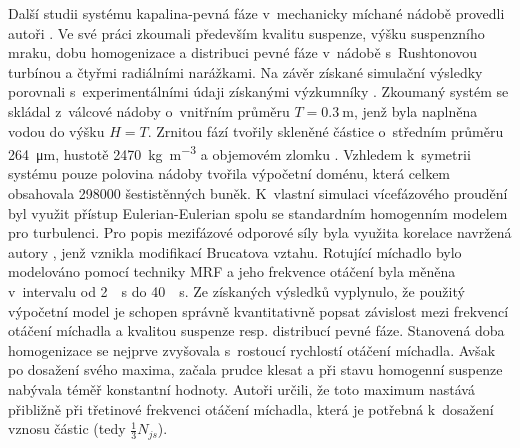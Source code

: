 Další studii systému kapalina-pevná fáze v~mechanicky míchané nádobě provedli autoři \citet{kas08}. Ve své práci zkoumali především kvalitu suspenze, výšku suspenzního mraku, dobu homogenizace a distribuci pevné fáze v~nádobě s~Rushtonovou turbínou a čtyřmi radiálními narážkami. Na závěr získané simulační výsledky porovnali s~experimentálními údaji získanými výzkumníky \citet{yama08}. Zkoumaný systém se skládal z~válcové nádoby o~vnitřním průměru $T=\SI{0.3}{\meter}$, jenž byla naplněna vodou do výšku $H=T$. Zrnitou fází tvořily skleněné částice o~středním průměru \SI{264}{\micro\meter}, hustotě \SI{2470}{\kilogram\per\cubic\meter} a objemovém zlomku . Vzhledem k~symetrii systému pouze polovina nádoby tvořila výpočetní doménu, která celkem obsahovala \num{298000} šestistěnných buněk. K~vlastní simulaci vícefázového proudění byl využit přístup Eulerian-Eulerian spolu se standardním homogenním \keps{} modelem pro turbulenci. Pro popis mezifázové odporové síly byla využita korelace navržená autory \citet{kho06}, jenž vznikla modifikací Brucatova vztahu. Rotující míchadlo bylo modelováno pomocí techniky MRF a jeho frekvence otáčení byla měněna v~intervalu od \SI{2}{\per\second} do \SI{40}{\per\second}. Ze získaných výsledků vyplynulo, že použitý výpočetní model je schopen správně kvantitativně popsat závislost mezi frekvencí otáčení míchadla a kvalitou suspenze resp. distribucí pevné fáze. Stanovená doba homogenizace se nejprve zvyšovala s~rostoucí rychlostí otáčení míchadla. Avšak po dosažení svého maxima, začala prudce klesat a při stavu homogenní suspenze nabývala téměř konstantní hodnoty. Autoři určili, že toto maximum nastává přibližně při třetinové frekvenci otáčení míchadla, která je potřebná k~dosažení vznosu částic (tedy $\frac{1}{3}N_{js}$).

